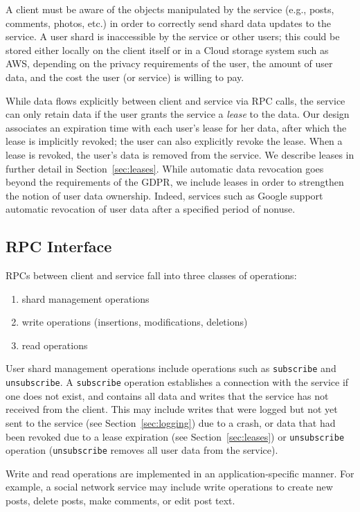 \documentclass[letterpaper,twocolumn,10pt]{article}
\begin{document}
A client must be aware of the objects manipulated by the service (e.g., posts, comments, photos, etc.) 
in order to correctly send shard data updates to the service. A user shard is inaccessible by the service or other users; 
this could be stored either locally on the client itself or in a Cloud storage system such as AWS, 
depending on the privacy requirements of the user, the amount of user data, and
the cost the user (or service) is willing to pay.

While data flows explicitly between client and service via RPC calls, 
the service can only retain data if the user grants the service a \emph{lease}
to the data. Our design associates an expiration time with each user's lease for her data, after
which the lease is implicitly revoked; the user can also explicitly revoke the lease.
When a lease is revoked, the user's data is removed from the service.
We describe leases in further detail in Section~\ref{sec:leases}. 
While automatic data revocation goes beyond the requirements of the GDPR, we include 
leases in order to strengthen the notion of user data ownership. Indeed, services such as Google 
support automatic revocation of user data after a specified period of nonuse.

\subsection{RPC Interface}
\label{sec:rpcs}
RPCs between client and service fall into three classes of operations:
\begin{enumerate}
    \item shard management operations
    \item write operations (insertions, modifications, deletions)
    \item read operations
\end{enumerate}

User shard management operations include operations such as \texttt{subscribe} and \texttt{unsubscribe}. 
A \texttt{subscribe} operation establishes a connection with the service if one does not exist, and contains all data and writes that the service has not received from the client. This may include writes that were logged but not yet sent to the service (see Section~\ref{sec:logging}) due to a crash, or data that had been revoked due to a lease expiration (see Section~\ref{sec:leases}) or \texttt{unsubscribe} operation (\texttt{unsubscribe} removes all user data from the service).

Write and read operations are implemented in an application-specific manner.
For example, a social network service may include write operations to create new posts,
delete posts, make comments, or edit post text.
\end{document}
